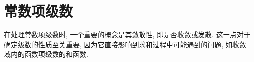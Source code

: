\section{常数项级数}

在处理常数项级数时, 一个重要的概念是其敛散性, 即是否收敛或发散. 这一点对于确定级数的性质至关重要, 因为它直接影响到求和过程中可能遇到的问题, 如收敛域内的函数项级数的和函数.

% 
